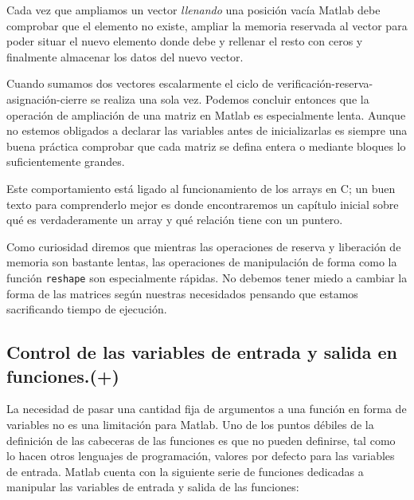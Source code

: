 Cada vez que ampliamos un vector \emph{llenando} una posición vacía
Matlab debe comprobar que el elemento no existe, ampliar la memoria
reservada al vector para poder situar el nuevo elemento donde debe y
rellenar el resto con ceros y finalmente almacenar los datos del nuevo
vector.

Cuando sumamos dos vectores escalarmente el ciclo de
verificación-reserva-asignación-cierre se realiza una sola vez.
Podemos concluir entonces que la operación de ampliación de una matriz
en Matlab es especialmente lenta.  Aunque no estemos obligados a
declarar las variables antes de inicializarlas es siempre una buena
práctica comprobar que cada matriz se defina entera o mediante bloques
lo suficientemente grandes.

Este comportamiento está ligado al funcionamiento de los arrays en C;
un buen texto para comprenderlo mejor es \cite{Numerical} donde
encontraremos un capítulo inicial sobre qué es verdaderamente un array
y qué relación tiene con un puntero.

Como curiosidad diremos que mientras las operaciones de reserva y
liberación de memoria son bastante lentas, las operaciones de
manipulación de forma como la función \texttt{reshape} son
especialmente rápidas.  No debemos tener miedo a cambiar la forma de
las matrices según nuestras necesidados pensando que estamos
sacrificando tiempo de ejecución.

\subsection{Control de las variables de entrada y salida en
  funciones.(+)}

La necesidad de pasar una cantidad fija de argumentos a una función en
forma de variables no es una limitación para Matlab. Uno de los puntos
débiles de la definición de las cabeceras de las funciones es que no
pueden definirse, tal como lo hacen otros lenguajes de programación,
valores por defecto para las variables de entrada. Matlab cuenta con
la siguiente serie de funciones dedicadas a manipular las variables de
entrada y salida de las funciones:

